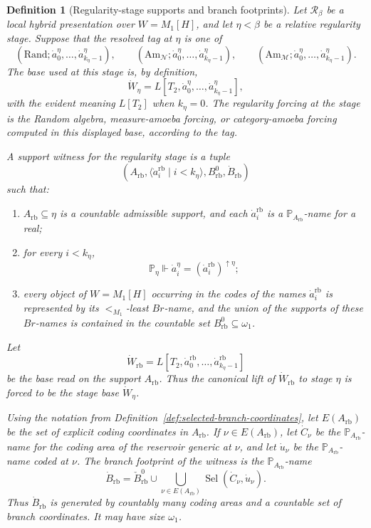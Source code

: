 \documentclass[10pt,a4paper]{amsart}
\newtheorem{definition}{Definition}
\begin{document}
\begin{definition}[Regularity-stage supports and branch footprints]
\label{def:admissible-random-base}
Let \(\mathcal R_\beta\) be a local hybrid presentation over \(W=M_1[H]\), and
let \(\eta<\beta\) be a relative regularity stage.  Suppose that the resolved
tag at \(\eta\) is one of
\[
   (\mathrm{Rand};\dot a^\eta_0,\ldots,\dot a^\eta_{k_\eta-1}),
   \qquad
   (\mathrm{Am}_{\mathcal N};\dot a^\eta_0,\ldots,
      \dot a^\eta_{k_\eta-1}),
   \qquad
   (\mathrm{Am}_{\mathcal M};\dot a^\eta_0,\ldots,
      \dot a^\eta_{k_\eta-1}).
\]
The base used at this stage is, by definition,
\[
   \dot W_\eta=L[T_2,\dot a^\eta_0,\ldots,
      \dot a^\eta_{k_\eta-1}],
\]
with the evident meaning \(L[T_2]\) when \(k_\eta=0\).  The regularity forcing
at the stage is the Random algebra, measure-amoeba forcing, or category-amoeba
forcing computed in this displayed base, according to the tag.

A \emph{support witness} for the regularity stage is a tuple
\[
   (A_{\mathrm{rb}},
    \langle \dot a^{\mathrm{rb}}_i\mid i<k_\eta\rangle,
    B^0_{\mathrm{rb}},
    \dot B_{\mathrm{rb}})
\]
such that:
\begin{enumerate}
   \item \(A_{\mathrm{rb}}\subseteq\eta\) is a countable admissible support, and
   each \(\dot a^{\mathrm{rb}}_i\) is a \(\mathbb P_{A_{\mathrm{rb}}}\)-name for
   a real;

   \item for every \(i<k_\eta\),
   \[
      \mathbb P_\eta\Vdash
      \dot a^\eta_i=(\dot a^{\mathrm{rb}}_i)^{\uparrow\eta};
   \]

   \item every object of \(W=M_1[H]\) occurring in the codes of the names
   \(\dot a^{\mathrm{rb}}_i\) is represented by its \(<_{M_1}\)-least
   \(Br\)-name, and the union of the supports of these \(Br\)-names is
   contained in the countable set \(B^0_{\mathrm{rb}}\subseteq\omega_1\).
\end{enumerate}
Let
\[
   \dot W_{\mathrm{rb}}
   =L[T_2,
      \dot a^{\mathrm{rb}}_0,\ldots,
      \dot a^{\mathrm{rb}}_{k_\eta-1}]
\]
be the base read on the support \(A_{\mathrm{rb}}\).  Thus the canonical lift of
\(\dot W_{\mathrm{rb}}\) to stage \(\eta\) is forced to be the stage base
\(\dot W_\eta\).

Using the notation from Definition~\ref{def:selected-branch-coordinates}, let
\(E(A_{\mathrm{rb}})\) be the set of explicit coding coordinates in
\(A_{\mathrm{rb}}\).  If \(\nu\in E(A_{\mathrm{rb}})\), let \(\dot C_\nu\) be the
\(\mathbb P_{A_{\mathrm{rb}}}\)-name for the coding area of the reservoir
generic at \(\nu\), and let \(\dot u_\nu\) be the
\(\mathbb P_{A_{\mathrm{rb}}}\)-name coded at \(\nu\).  The branch footprint of
the witness is the \(\mathbb P_{A_{\mathrm{rb}}}\)-name
\[
   \dot B_{\mathrm{rb}}
   =
   \check B^0_{\mathrm{rb}}
   \cup
   \bigcup_{\nu\in E(A_{\mathrm{rb}})}
      \operatorname{Sel}(\dot C_\nu,\dot u_\nu).
\]
Thus \(\dot B_{\mathrm{rb}}\) is generated by countably many coding areas and a
countable set of branch coordinates.  It may have size \(\omega_1\).


\end{definition}
\end{document}
